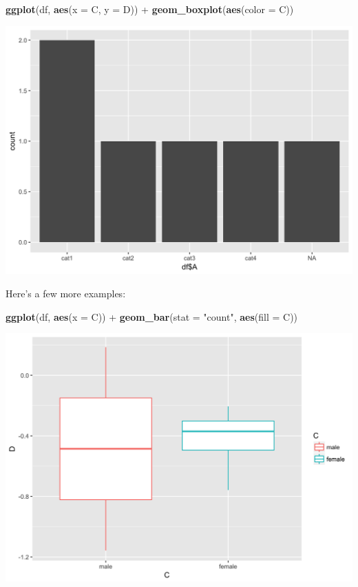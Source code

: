 \documentclass[]{tufte-book}
\newenvironment{Shaded}{}{}
\newcommand{\KeywordTok}[1]{\textcolor[rgb]{0.00,0.44,0.13}{\textbf{#1}}}
\newcommand{\DataTypeTok}[1]{\textcolor[rgb]{0.56,0.13,0.00}{#1}}
\newcommand{\StringTok}[1]{\textcolor[rgb]{0.25,0.44,0.63}{#1}}
\newcommand{\OperatorTok}[1]{\textcolor[rgb]{0.40,0.40,0.40}{#1}}
\newcommand{\NormalTok}[1]{#1}
\theoremstyle{definition}
\theoremstyle{definition}
\theoremstyle{remark}
\begin{document}
\begin{Shaded}
\begin{Highlighting}[]
\KeywordTok{ggplot}\NormalTok{(df, }\KeywordTok{aes}\NormalTok{(}\DataTypeTok{x =}\NormalTok{ C, }\DataTypeTok{y =}\NormalTok{ D)) }\OperatorTok{+}\StringTok{ }\KeywordTok{geom_boxplot}\NormalTok{(}\KeywordTok{aes}\NormalTok{(}\DataTypeTok{color =}\NormalTok{ C))}
\end{Highlighting}
\end{Shaded}

\includegraphics{_main_files/figure-latex/unnamed-chunk-57-1}

Here's a few more examples:

\begin{Shaded}
\begin{Highlighting}[]
\KeywordTok{ggplot}\NormalTok{(df, }\KeywordTok{aes}\NormalTok{(}\DataTypeTok{x =}\NormalTok{ C)) }\OperatorTok{+}\StringTok{ }\KeywordTok{geom_bar}\NormalTok{(}\DataTypeTok{stat =} \StringTok{"count"}\NormalTok{, }
    \KeywordTok{aes}\NormalTok{(}\DataTypeTok{fill =}\NormalTok{ C))}
\end{Highlighting}
\end{Shaded}

\includegraphics{_main_files/figure-latex/unnamed-chunk-58-1}
\end{document}
